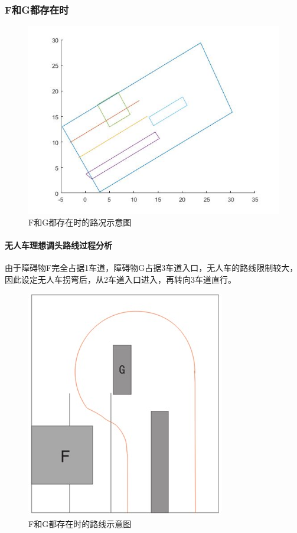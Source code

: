 \documentclass{article}
\begin{document}
\subsubsection{F和G都存在时}
\begin{figure}[H]
    \centering
    \includegraphics[scale=0.5]{18.jpg}
    \caption{F和G都存在时的路况示意图}
\end{figure}

\paragraph{无人车理想调头路线过程分析}
由于障碍物F完全占据1车道，障碍物G占据3车道入口，无人车的路线限制较大，因此设定无人车拐弯后，从2车道入口进入，再转向3车道直行。
\begin{figure}[H]
    \centering
    \includegraphics[scale=0.8]{19.jpg}
    \caption{F和G都存在时的路线示意图}
\end{figure}
\end{document}
